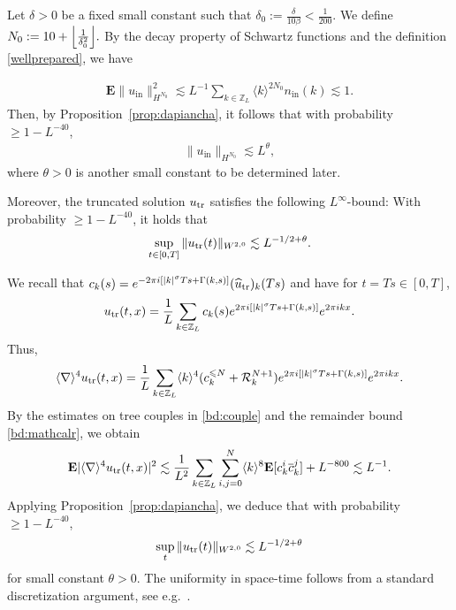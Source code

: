 \documentclass[UTF-8,reqno]{amsart}
\numberwithin{equation}{section}
\theoremstyle{definition}
\def\geq{\geqslant}
\def\leq{\leqslant}
\def\geq{\geqslant}
\def\leq{\leqslant}
\begin{document}
Let $\delta>0$ be a fixed small constant such that  $\delta_0 := \frac{\delta}{10\beta}<\frac1{200}$. We define
$
N_0 := 10 + \Bigl\lfloor \frac{1}{\delta_0^2} \Bigr\rfloor.$
By the decay property of Schwartz functions and the definition  \eqref{wellprepared}, we have
 
\begin{align*}
   \mathbf{E}\|u_{\mathrm{in}} \|^2_{H^{N_0}}\lesssim L^{-1}\sum_{k\in\mathbb{Z}_L} \langle k\rangle^{2N_0} n_{\mathrm{in}}(k) \lesssim 1. 
\end{align*}
Then, by Proposition~\ref{prop:dapiancha}, it follows that with probability $\geq 1-L^{-40}$,
\begin{align}\label{bd:uinhn0}
   \|u_{\mathrm{in}} \|_{H^{N_0}} \lesssim L^\theta,
\end{align}
where $\theta>0$ is another small constant to be determined later.

Moreover, the truncated solution $u_{\rm tr}$ satisfies the following $L^\infty$-bound: 
With probability $\geq 1-L^{-40}$, it holds that 
    \begin{align}
  \sup_{t\in[0,T]}  \|u_{\rm tr}(t)\|_{W^{2,0}}\lesssim L^{-1/2+\theta}.\label{bd:utrw2infty}
\end{align}
    
We recall that $ c_k(s)= e^{-2\pi i[|k|^\sigma Ts+\Gamma(k,s)]} (\widehat u_{\rm tr})_k(Ts)$ and have for $t=Ts\in[0,T]$,
\begin{align}
    u_{\rm tr}(t,x)=\frac{1}{L}\sum_{k \in \mathbb{Z}_L}  c_k(s) e^{2\pi i[|k|^\sigma Ts+\Gamma(k,s)]} e^{2\pi i kx}.\notag
\end{align}
Thus,
\begin{align}
    \langle \nabla \rangle^4u_{\rm tr}(t,x)=\frac{1}{L}\sum_{k \in \mathbb{Z}_L}   \langle k \rangle^4(c^{\leq N}_k  +\mathcal{R}^{N+1}_k)e^{2\pi i[|k|^\sigma Ts+\Gamma(k,s)]} e^{2\pi i kx}.\notag
\end{align}
By the estimates on tree couples in \eqref{bd:couple} and the remainder bound \eqref{bd:mathcalr}, we obtain
\begin{align}
    \mathbf{E}|\langle \nabla \rangle^4u_{\rm tr}(t,x)|^2\lesssim \frac{1}{L^{2}}\sum_{k \in \mathbb{Z}_L}\sum_{i,j=0}^N   \langle k \rangle^8  \mathbf{E}[c^{i}_k\overline c^{j}_k]  +L^{-800}\lesssim  L^{-1}.\notag
\end{align}
Applying Proposition~\ref{prop:dapiancha}, we deduce that with probability $\geq 1-L^{-40}$,
\begin{align*}
   \sup_t\|u_{\rm tr}(t)\|_{W^{2,0}}\lesssim L^{-1/2+\theta}
\end{align*}
for small constant $\theta>0$.  
The uniformity in space-time follows from a standard discretization argument, see e.g.\ \cite{DH21,DH23a}.
\end{document}
